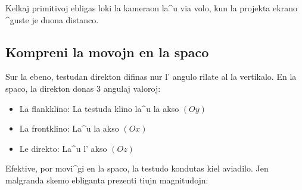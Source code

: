 Kelkaj primitivoj ebligas loki la kameraon la^u via volo, kun la
projekta ekrano ^guste je duona distanco.

\subsection{Kompreni la movojn en la spaco}

Sur la ebeno, testudan direkton difinas nur l' angulo rilate al la
vertikalo.  En la spaco, la direkton donas $3$ angulaj valoroj:

\begin{itemize}
\item La flankklino: La testuda klino la^u la akso $(Oy)$
\item La frontklino: La^u la akso $(Ox)$
\item Le direkto: La^u l' akso $(Oz)$ 
\end{itemize}

Efektive, por movi^gi en la spaco, la testudo kondutas kiel aviadilo.
Jen malgranda skemo ebliganta prezenti tiujn magnitudojn:

